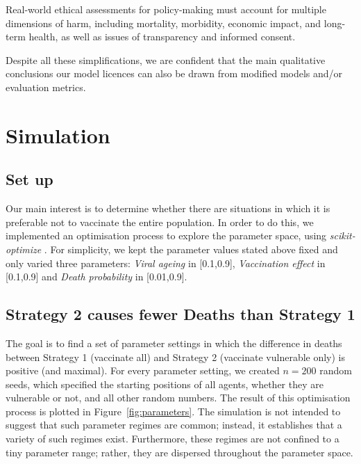 \documentclass[a4paper,12pt]{article}
\begin{document}

Real-world ethical assessments for policy-making must account for multiple dimensions of harm, including mortality, morbidity, economic impact, and long-term health, as well as issues of transparency and informed consent.

Despite all these simplifications, we are confident that the main qualitative conclusions our model licences can also be drawn from modified models and/or evaluation metrics.


\section{Simulation}\label{sec:Results}
\subsection{Set up}
Our main interest is to determine whether there are situations in which it is preferable not to vaccinate the entire population. In order to do this, we implemented an optimisation process to explore the parameter space, using \textit{scikit-optimize} \cite{head_scikit_optimize_2021}. For simplicity, we kept the parameter values stated above fixed and only varied three parameters: \emph{Viral ageing} in [0.1,0.9], \emph{Vaccination effect} in [0.1,0.9] and \emph{Death probability} in [0.01,0.9]. 

\subsection{Strategy 2 causes fewer Deaths than Strategy 1}
The goal is to find a set of parameter settings in which the difference in deaths between Strategy 1 (vaccinate all) and Strategy 2 (vaccinate vulnerable only) is positive (and maximal). For every parameter setting, we created $n=200$ random seeds, which specified the starting positions of all agents, whether they are vulnerable or not, and all other random numbers. The result of this optimisation process is plotted in Figure~\ref{fig:parameters}. The simulation is not intended to suggest that such parameter regimes are common; instead, it establishes that a variety of such regimes exist. Furthermore, these regimes are not confined to a tiny parameter range; rather, they are dispersed throughout the parameter space.
\end{document}
